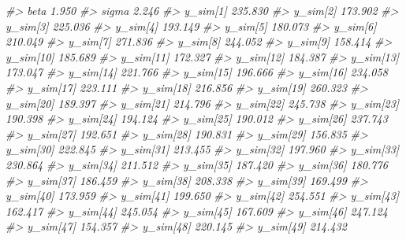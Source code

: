 \documentclass[
  10pt,
  italian,
  a4paper,
  extrafontsizes,onecolumn,openright
  ]{memoir}
\newenvironment{Shaded}{\begin{snugshade}}{\end{snugshade}}
\newcommand{\CommentTok}[1]{\textcolor[rgb]{0.56,0.35,0.01}{\textit{#1}}}
\begin{document}
\begin{Shaded}
\begin{Highlighting}[]
\CommentTok{\#\textgreater{}   beta         1.950}
\CommentTok{\#\textgreater{}   sigma        2.246}
\CommentTok{\#\textgreater{}   y\_sim[1]   235.830}
\CommentTok{\#\textgreater{}   y\_sim[2]   173.902}
\CommentTok{\#\textgreater{}   y\_sim[3]   225.036}
\CommentTok{\#\textgreater{}   y\_sim[4]   193.149}
\CommentTok{\#\textgreater{}   y\_sim[5]   180.073}
\CommentTok{\#\textgreater{}   y\_sim[6]   210.049}
\CommentTok{\#\textgreater{}   y\_sim[7]   271.836}
\CommentTok{\#\textgreater{}   y\_sim[8]   244.052}
\CommentTok{\#\textgreater{}   y\_sim[9]   158.414}
\CommentTok{\#\textgreater{}   y\_sim[10]  185.689}
\CommentTok{\#\textgreater{}   y\_sim[11]  172.327}
\CommentTok{\#\textgreater{}   y\_sim[12]  184.387}
\CommentTok{\#\textgreater{}   y\_sim[13]  173.047}
\CommentTok{\#\textgreater{}   y\_sim[14]  221.766}
\CommentTok{\#\textgreater{}   y\_sim[15]  196.666}
\CommentTok{\#\textgreater{}   y\_sim[16]  234.058}
\CommentTok{\#\textgreater{}   y\_sim[17]  223.111}
\CommentTok{\#\textgreater{}   y\_sim[18]  216.856}
\CommentTok{\#\textgreater{}   y\_sim[19]  260.323}
\CommentTok{\#\textgreater{}   y\_sim[20]  189.397}
\CommentTok{\#\textgreater{}   y\_sim[21]  214.796}
\CommentTok{\#\textgreater{}   y\_sim[22]  245.738}
\CommentTok{\#\textgreater{}   y\_sim[23]  190.398}
\CommentTok{\#\textgreater{}   y\_sim[24]  194.124}
\CommentTok{\#\textgreater{}   y\_sim[25]  190.012}
\CommentTok{\#\textgreater{}   y\_sim[26]  237.743}
\CommentTok{\#\textgreater{}   y\_sim[27]  192.651}
\CommentTok{\#\textgreater{}   y\_sim[28]  190.831}
\CommentTok{\#\textgreater{}   y\_sim[29]  156.835}
\CommentTok{\#\textgreater{}   y\_sim[30]  222.845}
\CommentTok{\#\textgreater{}   y\_sim[31]  213.455}
\CommentTok{\#\textgreater{}   y\_sim[32]  197.960}
\CommentTok{\#\textgreater{}   y\_sim[33]  230.864}
\CommentTok{\#\textgreater{}   y\_sim[34]  211.512}
\CommentTok{\#\textgreater{}   y\_sim[35]  187.420}
\CommentTok{\#\textgreater{}   y\_sim[36]  180.776}
\CommentTok{\#\textgreater{}   y\_sim[37]  186.459}
\CommentTok{\#\textgreater{}   y\_sim[38]  208.338}
\CommentTok{\#\textgreater{}   y\_sim[39]  169.499}
\CommentTok{\#\textgreater{}   y\_sim[40]  173.959}
\CommentTok{\#\textgreater{}   y\_sim[41]  199.650}
\CommentTok{\#\textgreater{}   y\_sim[42]  254.551}
\CommentTok{\#\textgreater{}   y\_sim[43]  162.417}
\CommentTok{\#\textgreater{}   y\_sim[44]  245.054}
\CommentTok{\#\textgreater{}   y\_sim[45]  167.609}
\CommentTok{\#\textgreater{}   y\_sim[46]  247.124}
\CommentTok{\#\textgreater{}   y\_sim[47]  154.357}
\CommentTok{\#\textgreater{}   y\_sim[48]  220.145}
\CommentTok{\#\textgreater{}   y\_sim[49]  214.432}

\end{Highlighting}
\end{Shaded}
\end{document}
